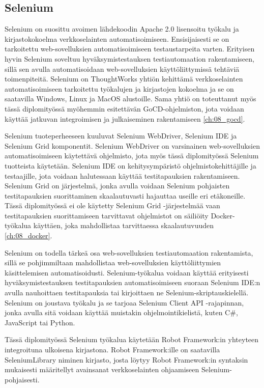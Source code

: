   \subsection{Selenium} \label{ch:08_selenium}

    Selenium on suosittu avoimen lähdekoodin Apache 2.0 lisensoitu työkalu ja kirjastokokoelma verkkoselainten automatisoimiseen.
    Ensisijaisesti se on tarkoitettu web-sovelluksien automatisoimiseen testaustarpeita varten.
    Erityisen hyvin Selenium soveltuu hyväksymistestauksen testiautomaation rakentamiseen, sillä sen avulla automatisoidaan web-sovelluksien käyttöliittymissä tehtäviä toimenpiteitä.
    Selenium on ThoughtWorks yhtiön kehittämä verkkoselainten automatisoimiseen tarkoitettu työkalujen ja kirjastojen kokoelma ja se on saatavilla Windows, Linux ja MacOS alustoille.
    Sama yhtiö on toteuttanut myös tässä diplomityössä myöhemmin esitettävän GoCD-ohjelmiston, jota voidaan käyttää jatkuvan integroimisen ja julkaiseminen rakentamiseen \ref{ch:08_gocd}.

    Selenium tuoteperheeseen kuuluvat Selenium WebDriver, Selenium IDE ja Selenium Grid komponentit.
    Selenium WebDriver on varsinainen web-sovelluksien automatisoimiseen käytettävä ohjelmisto, jota myös tässä diplomityössä Selenium tuotteista käytetään.
    Selenium IDE on kehitysympäristö ohjelmistokehittäjille ja testaajille, jota voidaan halutessaan käyttää testitapauksien rakentamiseen.
    Selenium Grid on järjestelmä, jonka avulla voidaan Selenium pohjaisten testitapauksien suorittaminen skaalautuvasti hajauttaa useille eri etäkoneille.
    Tässä diplomityössä ei ole käytetty Selenium Grid -järjestelmää vaan testitapauksien suorittamiseen tarvittavat ohjelmistot on säiliöity Docker-työkalua käyttäen, joka mahdollistaa tarvittaessa skaalautuvuuden \ref{ch:08_docker}.

    Selenium on todella tärkeä osa web-sovelluksien testiautomaation rakentamista, sillä se pohjimmiltaan mahdollistaa web-sovelluksien käyttöliittymien käsittelemisen automatisoidusti.
    Selenium-työkalua voidaan käyttää erityisesti hyväksymistestauksen testitapauksien automatisoimiseen suoraan Selenium IDE:n avulla nauhoittaen testitapauksia tai kirjoittaen ne Selenium-skriptauskielellä.
    Selenium on joustava työkalu ja se tarjoaa Selenium Client API -rajapinnan, jonka avulla sitä voidaan käyttää muistakin ohjelmointikielistä, kuten C\#, JavaScript tai Python.

    Tässä diplomityössä Selenium työkalua käytetään Robot Framework:in yhteyteen integroituna ulkoisena kirjastona.
    Robot Framework:ille on saatavilla SeleniumLibrary niminen kirjasto, josta löytyy Robot Framework:in syntaksin mukaisesti määritellyt avainsanat verkkoselainten ohjaamiseen Selenium-pohjaisesti.

